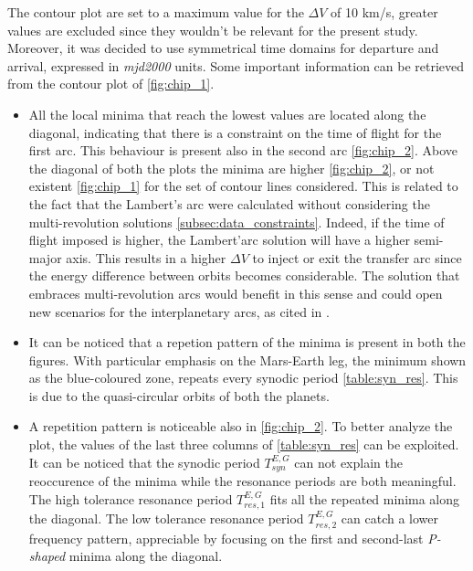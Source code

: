 
The contour plot are set to a maximum value for the $\Delta V$ of 10 km/s, greater values are excluded since they wouldn't be relevant for the present study. Moreover, it was decided to use symmetrical time domains for departure and arrival, expressed in \textit{mjd2000} units. 
Some important information can be retrieved from the contour plot of \autoref{fig:chip_1}.
\begin{itemize}
    [wide,itemsep=3pt,topsep=3pt]
    \item All the local minima that reach the lowest values are located along the diagonal, indicating that there is a constraint on the time of flight for the first arc. This behaviour is present also in the second arc \autoref{fig:chip_2}. Above the diagonal of both the plots the minima are higher \autoref{fig:chip_2}, or not existent \autoref{fig:chip_1} for the set of contour lines considered. This is related to the fact that the Lambert's arc were calculated without considering the multi-revolution solutions \autoref{subsec:data_constraints}. Indeed, if the time of flight imposed is higher, the Lambert'arc solution will have a higher semi-major axis. This results in a higher $\Delta V$ to inject or exit the transfer arc since the energy difference between orbits becomes considerable. The solution that embraces multi-revolution arcs would benefit in this sense and could open new scenarios for the interplanetary arcs, as cited in \cite{phd_menzio}.
    \item It can be noticed that a repetion pattern of the minima is present in both the figures. With particular emphasis on the Mars-Earth leg, the minimum shown as the blue-coloured zone, repeats every synodic period \autoref{table:syn_res}. This is due to the quasi-circular orbits of both the planets. 
    \item A repetition pattern is noticeable also in \autoref{fig:chip_2}. To better analyze the plot, the values of the last three columns of \autoref{table:syn_res} can be exploited. It can be noticed that the synodic period $T_{syn}^{E,G}$  can not explain the reoccurence of the minima while the resonance periods are both meaningful. The high tolerance resonance period $T_{res,1}^{E,G}$ fits all the repeated minima along the diagonal. The low tolerance resonance period $T_{res,2}^{E,G}$ can catch a lower frequency pattern, appreciable by focusing on the first and second-last \textit{P-shaped} minima along the diagonal.

\end{itemize}

